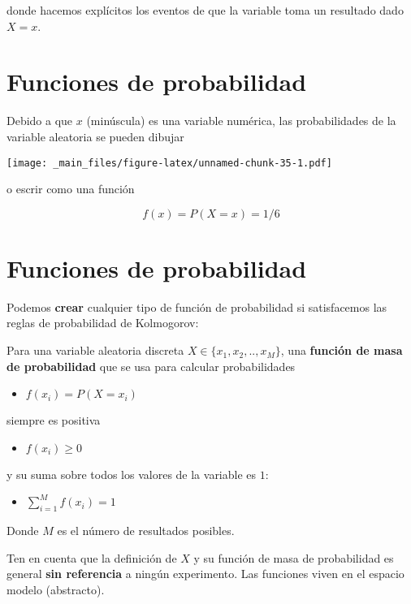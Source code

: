 \documentclass[
]{book}
\providecommand{\tightlist}{%
  \setlength{\itemsep}{0pt}\setlength{\parskip}{0pt}}
\begin{document}
donde hacemos explícitos los eventos de que la variable toma un resultado dado \(X=x\).

\hypertarget{funciones-de-probabilidad}{%
\section{Funciones de probabilidad}\label{funciones-de-probabilidad}}

Debido a que \(x\) (minúscula) es una variable numérica, las probabilidades de la variable aleatoria se pueden dibujar

\texttt{[image: \_main\_files/figure-latex/unnamed-chunk-35-1.pdf]}

o escrir como una función

\[f(x)=P(X=x)=1/6\]

\hypertarget{funciones-de-probabilidad-1}{%
\section{Funciones de probabilidad}\label{funciones-de-probabilidad-1}}

Podemos \textbf{crear} cualquier tipo de función de probabilidad si satisfacemos las reglas de probabilidad de Kolmogorov:

Para una variable aleatoria discreta \(X \in \{x_1 , x_2 , .. , x_M\}\), una \textbf{función de masa de probabilidad} que se usa para calcular probabilidades

\begin{itemize}
\tightlist
\item
  \(f(x_i)=P(X=x_i)\)
\end{itemize}

siempre es positiva

\begin{itemize}
\tightlist
\item
  \(f(x_i)\geq 0\)
\end{itemize}

y su suma sobre todos los valores de la variable es \(1\):

\begin{itemize}
\tightlist
\item
  \(\sum_{i=1}^M f(x_i)=1\)
\end{itemize}

Donde \(M\) es el número de resultados posibles.

Ten en cuenta que la definición de \(X\) y su función de masa de probabilidad es general \textbf{sin referencia} a ningún experimento. Las funciones viven en el espacio modelo (abstracto).
\end{document}

